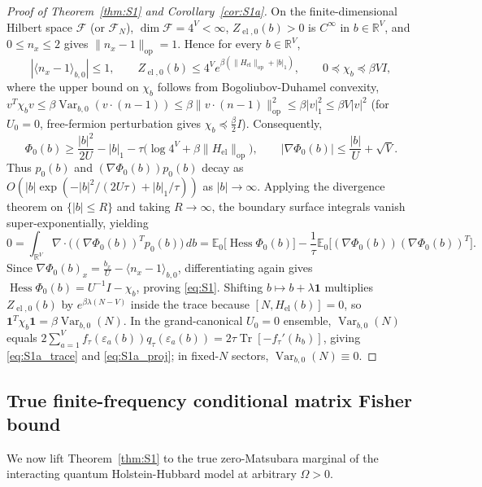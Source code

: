 \documentclass[11pt]{article}
\theoremstyle{definition}
\theoremstyle{remark}
\DeclareMathOperator{\Tr}{Tr}
\DeclareMathOperator{\Var}{Var}
\DeclareMathOperator{\Hess}{Hess}
\DeclareMathOperator{\op}{op}
\DeclareMathOperator{\el}{el}
\newcommand{\E}{\mathbb{E}}
\newcommand{\R}{\mathbb{R}}
\begin{document}
\begin{proof}[Proof of Theorem~\ref{thm:S1} and Corollary~\ref{cor:S1a}]
On the finite-dimensional Hilbert space $\mathcal{F}$ (or $\mathcal{F}_N$), $\dim \mathcal{F} = 4^V < \infty$, $Z_{\el,0}(b) > 0$ is $C^\infty$ in $b \in \R^V$, and $0 \le n_x \le 2$ gives $\|n_x - 1\|_{\op} = 1$. Hence for every $b \in \R^V$,
\[
|\langle n_x - 1 \rangle_{b,0}| \le 1, \qquad Z_{\el,0}(b) \le 4^V e^{\beta(\|H_{\el}\|_{\op} + |b|_1)}, \qquad 0 \preceq \chi_b \preceq \beta V I,
\]
where the upper bound on $\chi_b$ follows from Bogoliubov-Duhamel convexity, $v^T \chi_b v \le \beta \Var_{b,0}(v\cdot(n-1)) \le \beta \|v\cdot(n-1)\|_{\op}^2 \le \beta |v|_1^2 \le \beta V |v|^2$ (for $U_0 = 0$, free-fermion perturbation gives $\chi_b \preceq \frac{\beta}{2} I$). Consequently,
\[
\Phi_0(b) \ge \frac{|b|^2}{2U} - |b|_1 - \tau\bigl(\log 4^V + \beta \|H_{\el}\|_{\op}\bigr), \qquad |\nabla \Phi_0(b)| \le \frac{|b|}{U} + \sqrt{V}.
\]
Thus $p_0(b)$ and $(\nabla \Phi_0(b)) p_0(b)$ decay as $O(|b|\exp(-|b|^2/(2U\tau) + |b|_1/\tau))$ as $|b| \to \infty$. Applying the divergence theorem on $\{|b| \le R\}$ and taking $R \to \infty$, the boundary surface integrals vanish super-exponentially, yielding
\[
0 = \int_{\R^V} \nabla \cdot \bigl((\nabla \Phi_0(b))^T p_0(b)\bigr)\,db = \E_0\bigl[\Hess\Phi_0(b)\bigr] - \frac{1}{\tau}\E_0\bigl[(\nabla\Phi_0(b))(\nabla\Phi_0(b))^T\bigr].
\]
Since $\nabla \Phi_0(b)_x = \frac{b_x}{U} - \langle n_x - 1\rangle_{b,0}$, differentiating again gives $\Hess\Phi_0(b) = U^{-1} I - \chi_b$, proving \eqref{eq:S1}. Shifting $b \mapsto b + \lambda\mathbf{1}$ multiplies $Z_{\el,0}(b)$ by $e^{\beta \lambda (N-V)}$ inside the trace because $[N, H_{\el}(b)] = 0$, so $\mathbf{1}^T \chi_b \mathbf{1} = \beta \Var_{b,0}(N)$. In the grand-canonical $U_0=0$ ensemble, $\Var_{b,0}(N)$ equals $2\sum_{a=1}^V f_\tau(\varepsilon_a(b)) q_\tau(\varepsilon_a(b)) = 2\tau\Tr[-f_\tau'(h_b)]$, giving \eqref{eq:S1a_trace} and \eqref{eq:S1a_proj}; in fixed-$N$ sectors, $\Var_{b,0}(N) \equiv 0$.
\end{proof}

\subsection{True finite-frequency conditional matrix Fisher bound}

We now lift Theorem~\ref{thm:S1} to the true zero-Matsubara marginal of the interacting quantum Holstein-Hubbard model at arbitrary $\Omega > 0$.
\end{document}
